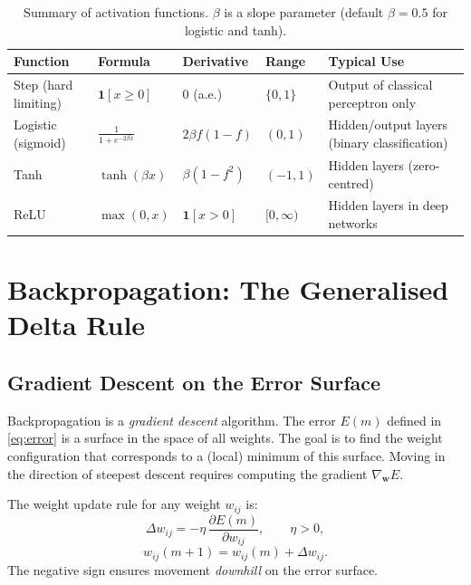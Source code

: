 \documentclass[12pt,a4paper]{article}
\begin{document}
\begin{table}[htbp]
\centering
\caption{Summary of activation functions.  $\beta$ is a slope parameter
  (default $\beta = 0.5$ for logistic and tanh).}
\label{tab:activations}
\renewcommand{\arraystretch}{1.4}
\begin{tabularx}{\linewidth}{lXXXX}
\toprule
\textbf{Function} & \textbf{Formula} & \textbf{Derivative} & \textbf{Range}
  & \textbf{Typical Use} \\
\midrule
Step (hard limiting)
  & $\mathbf{1}[x \geq 0]$
  & $0$ (a.e.)
  & $\{0,1\}$
  & Output of classical perceptron only \\
Logistic (sigmoid)
  & $\frac{1}{1+e^{-2\beta x}}$
  & $2\beta f(1-f)$
  & $(0,1)$
  & Hidden/output layers (binary classification) \\
Tanh
  & $\tanh(\beta x)$
  & $\beta(1-f^2)$
  & $(-1,1)$
  & Hidden layers (zero-centred) \\
ReLU
  & $\max(0,x)$
  & $\mathbf{1}[x>0]$
  & $[0,\infty)$
  & Hidden layers in deep networks \\
\bottomrule
\end{tabularx}
\end{table}

\section{Backpropagation: The Generalised Delta Rule}
\label{sec:backprop}

\subsection{Gradient Descent on the Error Surface}
\label{subsec:grad-descent}

Backpropagation is a \emph{gradient descent} algorithm.  The error $E(m)$
defined in \cref{eq:error} is a surface in the space of all weights.  The
goal is to find the weight configuration that corresponds to a (local) minimum
of this surface.  Moving in the direction of steepest descent requires
computing the gradient $\nabla_{\mathbf{w}} E$.

The weight update rule for any weight $w_{ij}$ is:
\begin{equation}
  \Delta w_{ij} = -\eta\,\frac{\partial E(m)}{\partial w_{ij}},
  \qquad \eta > 0,
  \label{eq:grad-descent}
\end{equation}
\begin{equation}
  w_{ij}(m+1) = w_{ij}(m) + \Delta w_{ij}.
  \label{eq:weight-update}
\end{equation}
The negative sign ensures movement \emph{downhill} on the error surface.
\end{document}
